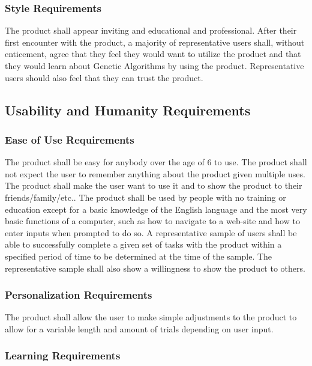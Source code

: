 \documentclass[12pt, titlepage]{article}
\begin{document}
\subsubsection{Style Requirements}

The product shall appear inviting and educational and professional. After their 
first encounter with the product, a majority of representative users shall, 
without enticement, agree that they feel they would want to utilize the product 
and that they would learn about Genetic Algorithms by using the product. 
Representative users should also feel that they can trust the product.

\subsection{Usability and Humanity Requirements}

\subsubsection{Ease of Use Requirements}

The product shall be easy for anybody over the age of 6 to use. The product 
shall not expect the user to remember anything about the product given multiple 
uses. The product shall make the user want to use it and to show the product to 
their friends/family/etc.. The product shall be used by people with no training 
or education except for a basic knowledge of the English language and the most 
very basic functions of a computer, such as how to navigate to a web-site and 
how to enter inputs when prompted to do so. A representative sample of users 
shall be able to successfully complete a given set of tasks with the product 
within a specified period of time to be determined at the time of the sample. 
The representative sample shall also show a willingness to show the product to 
others.

\subsubsection{Personalization Requirements}

The product shall allow the user to make simple adjustments to the product to 
allow for a variable length and amount of trials depending on user input. 

\subsubsection{Learning Requirements}
\end{document}
